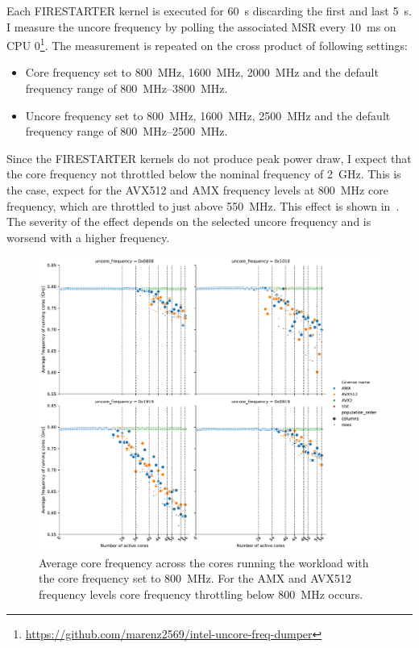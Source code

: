 Each FIRESTARTER kernel is executed for \SI{60}{\s} discarding the first and last \SI{5}{\s}.
I measure the uncore frequency by polling the associated MSR every \SI{10}{\ms} on CPU 0\footnote{\url{https://github.com/marenz2569/intel-uncore-freq-dumper}}.
The measurement is repeated on the cross product of following settings:
\begin{itemize}
    \item Core frequency set to \SI{800}{\MHz}, \SI{1600}{\MHz}, \SI{2000}{\MHz} and the default frequency range of \SI{800}{\MHz}--\SI{3800}{\MHz}.
    \item Uncore frequency set to \SI{800}{\MHz}, \SI{1600}{\MHz}, \SI{2500}{\MHz} and the default frequency range of \SI{800}{\MHz}--\SI{2500}{\MHz}.
\end{itemize}

Since the FIRESTARTER kernels do not produce peak power draw, I expect that the core frequency not throttled below the nominal frequency of \SI{2}{\GHz}.
This is the case, expect for the AVX512 and AMX frequency levels at \SI{800}{\MHz} core frequency, which are throttled to just above \SI{550}{\MHz}.
This effect is shown in~.
The severity of the effect depends on the selected uncore frequency and is worsend with a higher frequency.

\begin{figure}[]
    \centering
    \includegraphics[width=0.8\columnwidth]{fig/avx-frequency-license-bands-without-isst-core-frequency-800.pdf}
    \caption{\label{fig:avx-anomalies-low-freq}Average core frequency across the cores running the workload with the core frequency set to \SI{800}{\MHz}. For the AMX and AVX512 frequency levels core frequency throttling below \SI{800}{\MHz} occurs.}
\end{figure}

